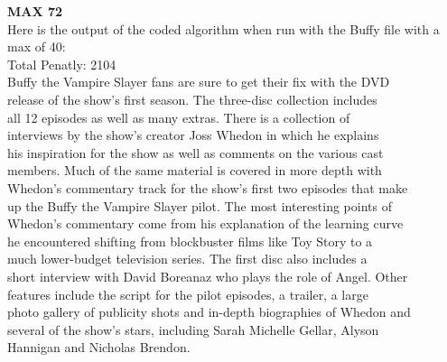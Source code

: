 \documentclass[11pt, solution, letterpaper]{format}
\begin{document}
\textbf{MAX 72}\\
Here is the output of the coded algorithm when run with the Buffy file with a max of 40:\\
Total Penatly: 2104\\
Buffy the Vampire Slayer fans are sure to get their fix with the DVD\\
release of the show's first season. The three-disc collection includes\\
all 12 episodes as well as many extras. There is a collection of\\
interviews by the show's creator Joss Whedon in which he explains\\
his inspiration for the show as well as comments on the various cast\\ 
members. Much of the same material is covered in more depth with\\
Whedon's commentary track for the show's first two episodes that make\\
up the Buffy the Vampire Slayer pilot. The most interesting points of\\
Whedon's commentary come from his explanation of the learning curve\\
he encountered shifting from blockbuster films like Toy Story to a\\
much lower-budget television series. The first disc also includes a\\
short interview with David Boreanaz who plays the role of Angel. Other\\
features include the script for the pilot episodes, a trailer, a large\\
photo gallery of publicity shots and in-depth biographies of Whedon and\\
several of the show's stars, including Sarah Michelle Gellar, Alyson\\
Hannigan and Nicholas Brendon. 
\end{document}
